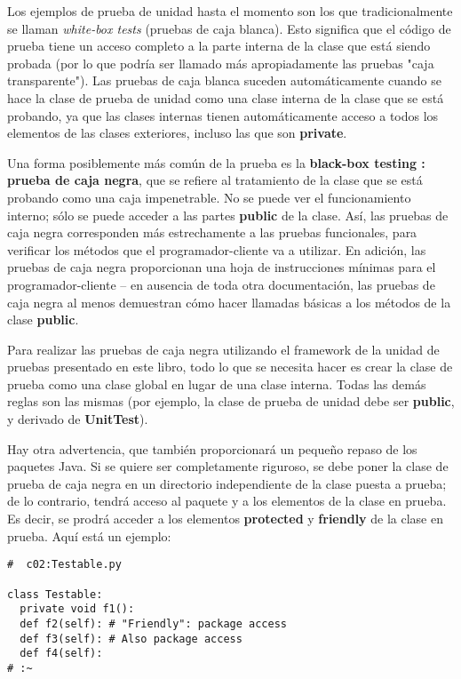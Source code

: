 Los ejemplos de prueba de unidad hasta el momento son los que tradicionalmente se llaman \textit{white-box tests} (pruebas de caja blanca). Esto significa que el código de prueba tiene un acceso completo a la parte interna de la clase que está siendo probada 
(por lo que podría ser llamado más apropiadamente las pruebas "caja transparente"). Las pruebas de caja blanca suceden automáticamente cuando se hace la clase de prueba de unidad como una clase interna de la clase que se está probando, ya que las clases internas tienen automáticamente acceso a todos los elementos de las clases exteriores, incluso las que son \textbf{private}.   \newline

Una forma posiblemente más común de la prueba es la \textbf{black-box testing :  prueba de caja negra}, que se refiere al tratamiento de la clase que se está probando como una caja impenetrable. No se puede ver el funcionamiento interno; sólo se puede acceder a las partes \textbf{public}  de la clase. Así, las pruebas de caja negra corresponden más estrechamente a las pruebas funcionales, para verificar los métodos que el programador-cliente va a utilizar. En adición, las pruebas de caja negra proporcionan una hoja de instrucciones mínimas para el programador-cliente  – en ausencia de toda otra documentación, las pruebas de caja negra al menos demuestran cómo hacer llamadas básicas a los métodos de la clase \textbf{public}.    \newline

Para realizar las pruebas de caja negra utilizando el framework de la unidad de pruebas presentado en este libro, todo lo que se necesita hacer es crear la clase de prueba como una clase global en lugar de una clase interna. Todas las demás reglas son las mismas (por ejemplo, la clase de prueba de unidad debe ser \textbf{public}, y derivado de \textbf{UnitTest}).     \newline

Hay otra advertencia, que también proporcionará un pequeño repaso de los paquetes Java. Si se quiere ser completamente riguroso, se debe poner la clase de prueba de caja negra en un directorio independiente de la clase puesta a prueba; de lo contrario, tendrá acceso al paquete y a los elementos de la clase en prueba. Es decir, se prodrá acceder a los elementos \textbf{protected} y \textbf{friendly} de la clase en prueba. Aquí está un ejemplo: \newline

\begin{lstlisting}
#  c02:Testable.py 

class Testable: 
  private void f1(): 
  def f2(self): # "Friendly": package access 
  def f3(self): # Also package access 
  def f4(self): 
# :~ 
\end{lstlisting}

